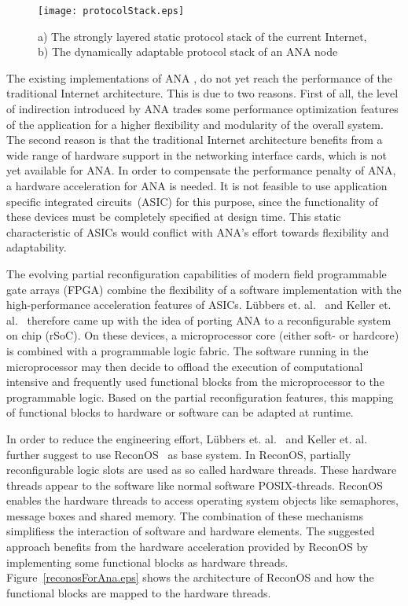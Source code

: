 \begin{figure}
  \begin{center}
		 \texttt{[image: protocolStack.eps]}
  \caption{a) The strongly layered static protocol stack of the current Internet, b) The dynamically adaptable protocol stack of an ANA node}
  \label{protocolStack.eps}
  \end{center}
\end{figure}
The existing implementations of ANA \cite{ana}, \cite{lana} do not yet reach the performance of the traditional Internet architecture. This is due to two reasons. First of all, the level of indirection introduced by ANA trades some performance optimization features of the application for a higher flexibility and modularity of the overall system. The second reason is that the traditional Internet architecture benefits from a wide range of hardware support in the networking interface cards, which is not yet available for ANA. In order to compensate the performance penalty of ANA, a hardware acceleration for ANA is needed. It is not feasible to use application specific integrated circuits~(ASIC) for this purpose, since the functionality of these devices must be completely specified at design time. This static characteristic of ASICs would conflict with ANA's effort towards flexibility and adaptability.

The evolving partial reconfiguration capabilities of modern field programmable gate arrays (FPGA) combine the flexibility of a software implementation with the high-performance acceleration features of ASICs. L\"{u}bbers et. al.~\cite{towardsAdaptiveNetworkingForEmbeddedDevices} and Keller et. al.~\cite{reconfigurableNodesForFutureNetworks} therefore came up with the idea of porting ANA to a reconfigurable system on chip (rSoC). On these devices, a microprocessor core (either soft- or hardcore)  is combined with a programmable logic fabric. The software running in the microprocessor may then decide to offload the execution of computational intensive and frequently used functional blocks from the microprocessor to the programmable logic. Based on the partial reconfiguration features, this mapping of functional blocks to hardware or software can be adapted at runtime.

In order to reduce the engineering effort, L\"{u}bbers et. al.~\cite{towardsAdaptiveNetworkingForEmbeddedDevices} and Keller et. al.~\cite{reconfigurableNodesForFutureNetworks} further suggest to use ReconOS~\cite{reconos} as base system. In ReconOS, partially reconfigurable logic slots are used as so called hardware threads. These hardware threads appear to the software like normal software POSIX-threads. ReconOS enables the hardware threads to access operating system objects like semaphores, message boxes and shared memory. The combination of these mechanisms simplifiess the interaction of software and hardware elements. The suggested approach benefits from the hardware acceleration provided by ReconOS by implementing some functional blocks as hardware threads. Figure~\ref{reconosForAna.eps} shows the architecture of ReconOS and how the functional blocks are mapped to the hardware threads.

